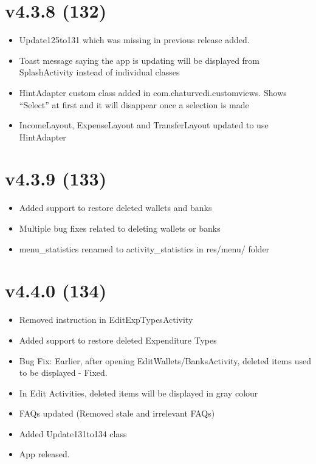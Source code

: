 \documentclass{article}
\begin{document}
    \section{v4.3.8 (132)}\label{sec:132}
    \begin{itemize}
        \item Update125to131 which was missing in previous release added.
        \item Toast message saying the app is updating will be displayed from SplashActivity instead of individual classes
        \item HintAdapter custom class added in com.chaturvedi.customviews.
        Shows ``Select'' at first and it will disappear once a selection is made
        \item IncomeLayout, ExpenseLayout and TransferLayout updated to use HintAdapter
    \end{itemize}

    \section{v4.3.9 (133)}\label{sec:133}
    \begin{itemize}
        \item Added support to restore deleted wallets and banks
        \item Multiple bug fixes related to deleting wallets or banks
        \item menu\_statistics renamed to activity\_statistics in res/menu/ folder
    \end{itemize}

    \section{v4.4.0 (134)}\label{sec:134}
    \begin{itemize}
        \item Removed instruction in EditExpTypesActivity
        \item Added support to restore deleted Expenditure Types
        \item Bug Fix: Earlier, after opening EditWallets/BanksActivity, deleted items used to be displayed - Fixed.
        \item In Edit Activities, deleted items will be displayed in gray colour
        \item FAQs updated (Removed stale and irrelevant FAQs)
        \item Added Update131to134 class
        \item App released.
    \end{itemize}
\end{document}
